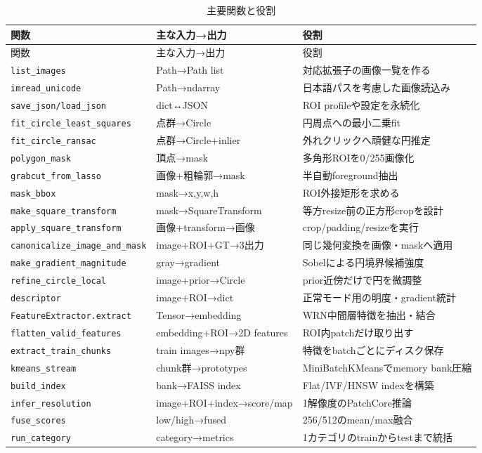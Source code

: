 \documentclass[a4paper,11pt]{ltjsreport}
\begin{document}
\small
\begin{longtable}{L{48mm} L{34mm} L{66mm}}
\caption{主要関数と役割}\label{tab:functions}\\
\toprule
関数 & 主な入力→出力 & 役割 \\
\midrule
\endfirsthead
\toprule
関数 & 主な入力→出力 & 役割 \\
\midrule
\endhead
\texttt{list\_images} & Path→Path list & 対応拡張子の画像一覧を作る \\
\texttt{imread\_unicode} & Path→ndarray & 日本語パスを考慮した画像読込み \\
\texttt{save\_json/load\_json} & dict↔JSON & ROI profileや設定を永続化 \\
\texttt{fit\_circle\_least\_squares} & 点群→Circle & 円周点への最小二乗fit \\
\texttt{fit\_circle\_ransac} & 点群→Circle+inlier & 外れクリックへ頑健な円推定 \\
\texttt{polygon\_mask} & 頂点→mask & 多角形ROIを0/255画像化 \\
\texttt{grabcut\_from\_lasso} & 画像+粗輪郭→mask & 半自動foreground抽出 \\
\texttt{mask\_bbox} & mask→x,y,w,h & ROI外接矩形を求める \\
\texttt{make\_square\_transform} & mask→SquareTransform & 等方resize前の正方形cropを設計 \\
\texttt{apply\_square\_transform} & 画像+transform→画像 & crop/padding/resizeを実行 \\
\texttt{canonicalize\_image\_and\_mask} & image+ROI+GT→3出力 & 同じ幾何変換を画像・maskへ適用 \\
\texttt{make\_gradient\_magnitude} & gray→gradient & Sobelによる円境界候補強度 \\
\texttt{refine\_circle\_local} & image+prior→Circle & prior近傍だけで円を微調整 \\
\texttt{descriptor} & image+ROI→dict & 正常モード用の明度・gradient統計 \\
\texttt{FeatureExtractor.extract} & Tensor→embedding & WRN中間層特徴を抽出・結合 \\
\texttt{flatten\_valid\_features} & embedding+ROI→2D features & ROI内patchだけ取り出す \\
\texttt{extract\_train\_chunks} & train images→npy群 & 特徴をbatchごとにディスク保存 \\
\texttt{kmeans\_stream} & chunk群→prototypes & MiniBatchKMeansでmemory bank圧縮 \\
\texttt{build\_index} & bank→FAISS index & Flat/IVF/HNSW indexを構築 \\
\texttt{infer\_resolution} & image+ROI+index→score/map & 1解像度のPatchCore推論 \\
\texttt{fuse\_scores} & low/high→fused & 256/512のmean/max融合 \\
\texttt{run\_category} & category→metrics & 1カテゴリのtrainからtestまで統括 \\
\bottomrule
\end{longtable}
\normalsize
\end{document}

